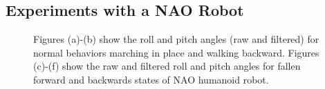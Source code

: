 \documentclass[letterpaper]{article}
\begin{document}
\begin{sloppy}
\subsection{Experiments with a NAO Robot}
 

\begin{figure}[!ht]
  \centering
  \caption{Figures (a)-(b) show the roll and pitch angles (raw and filtered) for normal 
behaviors marching in place and walking backward. Figures (c)-(f) show the raw and filtered roll 
and pitch angles for fallen forward and backwards states of NAO humanoid robot.}
  \label{fig:normalFallenBehavior}


\end{figure}
\end{sloppy}
\end{document}
